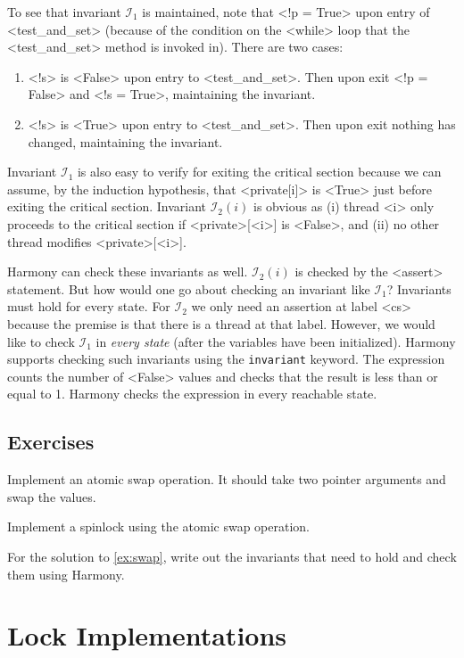 \documentclass{report}
\begin{document}
To see that invariant $\mathcal{I}_1$ is maintained, note that
<{!p = True}> upon entry of <{test_and_set}>
(because of the condition on the <{while}> loop that the
<{test_and_set}> method is invoked in).
There are two cases:
\begin{enumerate}
\item <{!s}> is <{False}> upon entry to <{test_and_set}>.
Then upon exit <{!p = False}> and <{!s = True}>,
maintaining the invariant.
\item <{!s}> is <{True}> upon entry to <{test_and_set}>.
Then upon exit nothing has changed, maintaining the invariant.
\end{enumerate}
Invariant $\mathcal{I}_1$ is also easy to verify for exiting the critical section
because we can assume, by the induction hypothesis, that <{private[i]}> is
<{True}> just before exiting the critical section.
Invariant $\mathcal{I}_2(i)$ is obvious as (i) thread <{i}> only proceeds to the critical
section if <{private}>[<{i}>] is <{False}>, and (ii) no other thread modifies
<{private}>[<{i}>].

Harmony can check these invariants as well.
$\mathcal{I}_2(i)$ is checked by the <{assert}> statement.
But how would one go about checking an
invariant like $\mathcal{I}_1$?  Invariants must hold for every state.
For $\mathcal{I}_2$ we only need an assertion at label <{cs}> because the
premise is that there is a thread at that label.  However, we would
like to check $\mathcal{I}_1$ in \emph{every state} (after the variables have
been initialized).
Harmony supports checking such invariants using the \texttt{invariant}
keyword.
The expression counts the number of <{False}> values and checks that
the result is less than or equal to 1.
Harmony checks the expression in every reachable state.

\section*{Exercises}
\begin{problems}
\item Implement an atomic swap operation.  It should take two pointer arguments
and swap the values.
\item \label{ex:swap} Implement a spinlock using the atomic swap operation.
\item For the solution to \autoref{ex:swap},
write out the invariants that need to hold and check them using Harmony.
\end{problems}

\chapter{Lock Implementations}
\label{ch:synch}
%
%
\end{document}
